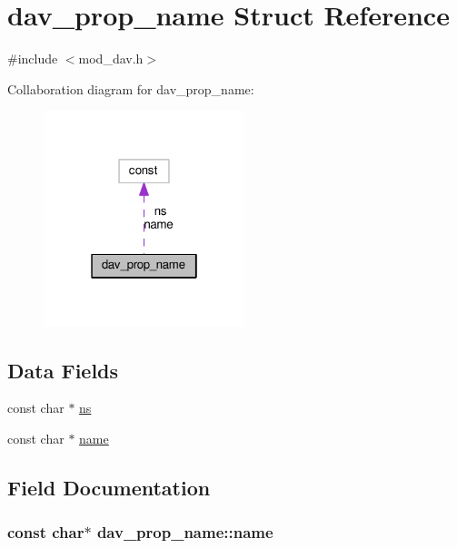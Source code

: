 \hypertarget{structdav__prop__name}{}\section{dav\+\_\+prop\+\_\+name Struct Reference}
\label{structdav__prop__name}


{\ttfamily \#include $<$mod\+\_\+dav.\+h$>$}



Collaboration diagram for dav\+\_\+prop\+\_\+name\+:
\nopagebreak
\begin{figure}[H]
\begin{center}
\leavevmode
\includegraphics[width=166pt]{structdav__prop__name__coll__graph}
\end{center}
\end{figure}
\subsection*{Data Fields}
\begin{DoxyCompactItemize}
\item 
const char $\ast$ \hyperlink{structdav__prop__name_ac32f7eed5e8b6b8fd7f193b253b036dc}{ns}
\item 
const char $\ast$ \hyperlink{structdav__prop__name_ac6a5df59f29b22f0d9129257d49ef3e7}{name}
\end{DoxyCompactItemize}


\subsection{Field Documentation}
\subsubsection[{\texorpdfstring{name}{name}}]{\setlength{\rightskip}{0pt plus 5cm}const char$\ast$ dav\+\_\+prop\+\_\+name\+::name}\hypertarget{structdav__prop__name_ac6a5df59f29b22f0d9129257d49ef3e7}{}\label{structdav__prop__name_ac6a5df59f29b22f0d9129257d49ef3e7}
